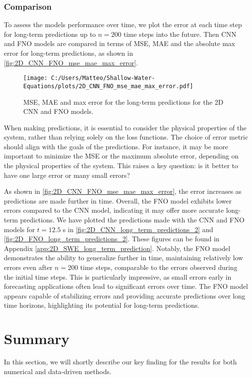 \subsubsection*{Comparison}
To assess the models performance over time, we plot the error at each time step for long-term predictions up to $n = 200$ time steps into the future.
Then CNN and FNO models are compared in terms of MSE, MAE and the absolute max error for long-term predictions, as shown in \autoref{fig:2D_CNN_FNO_mse_mae_max_error}.
\begin{figure}[H]
    \centering
    \texttt{[image: C:/Users/Matteo/Shallow-Water-Equations/plots/2D\_CNN\_FNO\_mse\_mae\_max\_error.pdf]}
    \caption{MSE, MAE and max error for the long-term predictions for the 2D CNN and FNO models.}\label{fig:2D_CNN_FNO_mse_mae_max_error}
\end{figure}
When making predictions, it is essential to consider the physical properties of the system, rather than relying solely on the loss functions.
The choice of error metric should align with the goals of the predictions.
For instance, it may be more important to minimize the MSE or the maximum absolute error, depending on the physical properties of the system.
This raises a key question: is it better to have one large error or many small errors?

As shown in \autoref{fig:2D_CNN_FNO_mse_mae_max_error}, the error increases as predictions are made further in time.
Overall, the FNO model exhibits lower errors compared to the CNN model, indicating it may offer more accurate long-term predictions.
We have plotted the predictions made with the CNN and FNO models for $t = 12.5$ s in \autoref{fig:2D_CNN_long_term_predictions_2} and \autoref{fig:2D_FNO_long_term_predictions_2}.
These figures can be found in Appendix \autoref{app:2D_SWE_long_term_prediction}.
Notably, the FNO model demonstrates the ability to generalize further in time, maintaining relatively low errors even after $n = 200$ time steps, comparable to the errors observed during the initial time steps.
This is particularly impressive, as small errors early in forecasting applications often lead to significant errors over time.
The FNO model appears capable of stabilizing errors and providing accurate predictions over long time horizons, highlighting its potential for long-term predictions.


\section{Summary}
In this section, we will shortly describe our key finding for the results for both numerical and data-driven methods.

